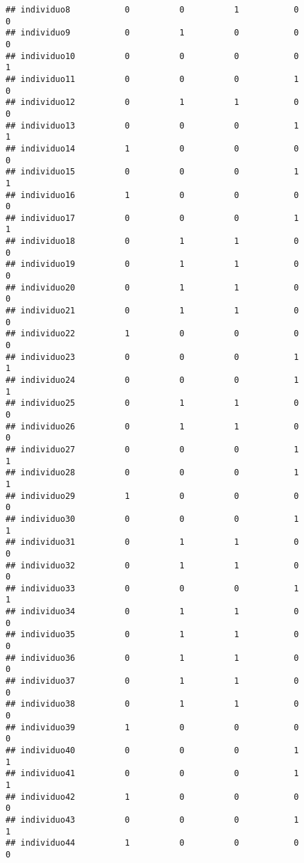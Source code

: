 \documentclass[
]{article}
\begin{document}
\begin{verbatim}
## individuo8           0          0          1           0           0
## individuo9           0          1          0           0           0
## individuo10          0          0          0           0           1
## individuo11          0          0          0           1           0
## individuo12          0          1          1           0           0
## individuo13          0          0          0           1           1
## individuo14          1          0          0           0           0
## individuo15          0          0          0           1           1
## individuo16          1          0          0           0           0
## individuo17          0          0          0           1           1
## individuo18          0          1          1           0           0
## individuo19          0          1          1           0           0
## individuo20          0          1          1           0           0
## individuo21          0          1          1           0           0
## individuo22          1          0          0           0           0
## individuo23          0          0          0           1           1
## individuo24          0          0          0           1           1
## individuo25          0          1          1           0           0
## individuo26          0          1          1           0           0
## individuo27          0          0          0           1           1
## individuo28          0          0          0           1           1
## individuo29          1          0          0           0           0
## individuo30          0          0          0           1           1
## individuo31          0          1          1           0           0
## individuo32          0          1          1           0           0
## individuo33          0          0          0           1           1
## individuo34          0          1          1           0           0
## individuo35          0          1          1           0           0
## individuo36          0          1          1           0           0
## individuo37          0          1          1           0           0
## individuo38          0          1          1           0           0
## individuo39          1          0          0           0           0
## individuo40          0          0          0           1           1
## individuo41          0          0          0           1           1
## individuo42          1          0          0           0           0
## individuo43          0          0          0           1           1
## individuo44          1          0          0           0           0

\end{verbatim}
\end{document}
